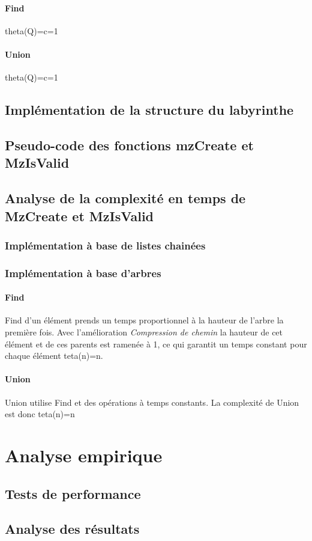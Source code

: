 \documentclass[11pt]{article}
\begin{document}
		\paragraph{Find}
		theta(Q)=c=1		
		\paragraph{Union}
		theta(Q)=c=1
	\subsection{Implémentation de la structure du labyrinthe}
	\subsection{Pseudo-code des fonctions mzCreate et MzIsValid}
	\subsection{Analyse de la complexité en temps de MzCreate et MzIsValid}
		\subsubsection{Implémentation à base de listes chainées}
		\subsubsection{Implémentation à base d'arbres}
			\paragraph{Find}		
		Find d'un élément prends un temps proportionnel à la hauteur de l'arbre la première fois. Avec l'amélioration \textit{Compression de chemin} la hauteur de cet élément et de ces parents est ramenée à 1, ce qui garantit un temps constant pour chaque élément teta(n)=n.
		\paragraph{Union}
		Union utilise Find et des opérations à temps constants. La complexité de Union est donc teta(n)=n
\section{Analyse empirique}
	\subsection{Tests de performance}
	\subsection{Analyse des résultats}
\end{document}
